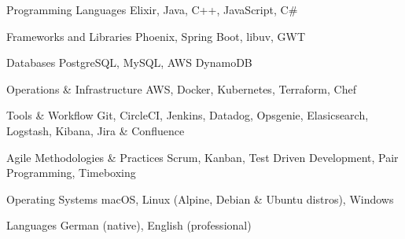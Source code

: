 

\begin{cvskills}

  \cvskill
    {Programming Languages} %
    {Elixir, Java, C++, JavaScript, C\#} %
  
  \cvskill
    {Frameworks and Libraries} %
    {Phoenix, Spring Boot, libuv, GWT} %
  
  \cvskill
    {Databases} %
    {PostgreSQL, MySQL, AWS DynamoDB} %

  \cvskill
    {Operations \& Infrastructure} %
    {AWS, Docker, Kubernetes, Terraform, Chef} %

  \cvskill
    {Tools \& Workflow} %
    {Git, CircleCI, Jenkins, Datadog, Opsgenie, Elasicsearch, Logstash, Kibana, Jira \& Confluence} %

  \cvskill
    {Agile Methodologies \& Practices} %
    {Scrum, Kanban, Test Driven Development, Pair Programming, Timeboxing} %

  \cvskill
    {Operating Systems} %
    {macOS, Linux (Alpine, Debian \& Ubuntu distros), Windows} %

  \cvskill
    {Languages} %
    {German (native), English (professional)} %

\end{cvskills}
